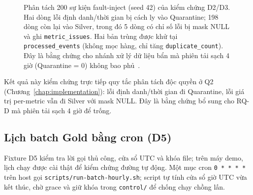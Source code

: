 \begin{figure}[H]
\centering
\begingroup
{}
\endgroup
\caption[Phân tách 200 sự kiện fault-inject qua Silver và Quarantine]{Phân tách 200 sự kiện fault-inject (seed 42) của kiểm chứng D2/D3. Hai dòng lỗi định danh/thời gian bị cách ly vào Quarantine; 198 dòng còn lại vào Silver, trong đó 5 dòng có chỉ số lỗi bị mask NULL và ghi \texttt{metric\_issues}. Hai bản trùng được khử tại \texttt{processed\_events} (không mọc hàng, chỉ tăng \texttt{duplicate\_count}). Đây là bằng chứng cho nhánh xử lý dữ liệu bẩn mà phiên tải sạch 4 giờ (Quarantine = 0) không bao phủ~\cite{bigdata_run_archive}.}
\label{fig:veracity-fixture}
\end{figure}

Kết quả này kiểm chứng trực tiếp quy tắc phân tách độc quyền ở Q2 (Chương~\ref{chap:implementation}): lỗi định danh/thời gian đi Quarantine, lỗi giá trị per-metric vẫn đi Silver với mask NULL. Đây là bằng chứng bổ sung cho RQ-D mà phiên tải sạch 4 giờ để trống.

\subsection{Lịch batch Gold bằng cron (D5)}
\label{subsec:d5-detail}
Fixture D5 kiểm tra lời gọi thủ công, cửa sổ UTC và khóa file; trên máy demo,
lịch chạy được cài thật để kiểm chứng đường tự động. Một mục cron
\texttt{0 * * * *} trên host gọi \texttt{scripts/run-batch-hourly.sh}; script
tự tính cửa sổ giờ UTC vừa kết thúc, chờ grace và giữ khóa trong
\texttt{control/} để chống chạy chồng lấn.

